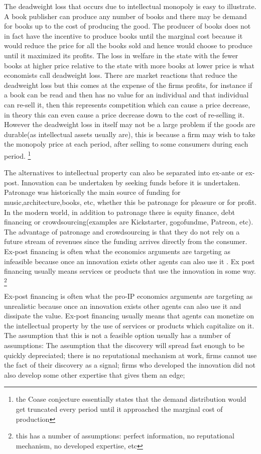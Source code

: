 \documentclass[12pt]{article}
\numberwithin{equation}{section}
\begin{document}
The deadweight loss that occurs due to intellectual monopoly is easy to illustrate. A book publisher can produce any number of books and there may be demand for books up to the cost of producing the good. The producer of books does not in fact have the incentive to produce books until the marginal cost because it would reduce the price for all the books sold and hence would choose to produce until it maximized its profits. The loss in welfare in the state with the fewer books at higher price relative to the state with more books at lower price is what economists call deadweight loss. There are market reactions that reduce the deadweight loss but this comes at the expense of the firms profits, for instance if a book can be read and then has no value for an individual and that individual can re-sell it, then this represents competition which can cause a price decrease, in theory this can even cause a price decrease down to the cost of re-selling it. However the deadweight loss in itself may not be a large problem if the goods are durable(as intellectual assets usually are), this is because a firm may wish to take the monopoly price at each period, after selling to some consumers during each period. \footnote{the Coase conjecture essentially states that the demand distribution would get truncated every period until it approached the marginal cost of production}%

The alternatives to intellectual property can also be separated into ex-ante or ex-post. Innovation can be undertaken by seeking funds before it is undertaken. Patronage was historically the main source of funding for music,architecture,books, etc, whether this be patronage for pleasure or for profit. In the modern world, in addition to patronage there is equity finance, debt financing or crowdsourcing(examples are Kickstarter, gogofundme, Patreon, etc). The advantage of patronage and crowdsourcing is that they do not rely on a future stream of revenues since the funding arrives directly from the consumer. Ex-post financing is often what the economics arguments are targeting as infeasible because once an innovation exists other agents can also use it  . Ex post financing usually means services or products that use the innovation in some way. \footnote{ this has a number of assumptions: perfect information, no reputational mechanism, no developed expertise, etc }


Ex-post financing is often what the pro-IP economics arguments are targeting as unrealistic because once an innovation exists other agents can also use it and dissipate the value. Ex-post financing usually means that agents can monetize on the intellectual property by the use of services or products which capitalize on it. The assumption that this is not a feasible option usually has a number of assumptions: The assumption that the discovery will spread fast enough to be quickly depreciated; there is no reputational mechanism at work, firms cannot use the fact of their discovery as a signal; firms who developed the innovation did not also develop some other expertise that gives them an edge;
\end{document}
